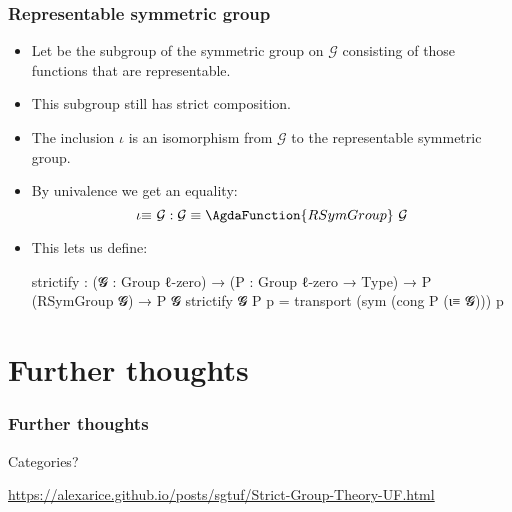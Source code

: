 \documentclass[aspectratio=169,presentation]{beamer}
\begin{document}
\begin{frame}
  \frametitle{Representable symmetric group}

  \begin{itemize}
  \item<+-> Let \AgdaSpace{} be the subgroup of the symmetric group on \(\mathcal{G}\) consisting of those functions that are representable.

  \item<+-> This subgroup still has strict composition.
  \item<+-> The inclusion \(ι\) is an isomorphism from \(\mathcal{G}\) to the representable symmetric group.
  \item<+-> By univalence we get an equality:
    \[ \iota\mathord\equiv~\mathcal{G}: \mathcal{G} \equiv \AgdaFunction{RSymGroup}~\mathcal{G} \]
  \item<+-> This lets us define:
    \begin{code}
      strictify :  (𝓖 : Group ℓ-zero)
                →  (P : Group ℓ-zero → Type)
                →  P (RSymGroup 𝓖)
                →  P 𝓖
      strictify 𝓖 P p = transport (sym (cong P (ι≡ 𝓖))) p
    \end{code}
  \end{itemize}
\end{frame}

\section{Further thoughts}
\begin{frame}
  \frametitle{Further thoughts}
  \pause{}
  Categories?
\end{frame}
\begin{frame}
  \url{https://alexarice.github.io/posts/sgtuf/Strict-Group-Theory-UF.html}
\end{frame}
\end{document}
